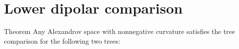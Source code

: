 \section{Lower dipolar comparison}

\begin{thm}{Theorem}
Any Alexandrov space with nonnegative curvature satisfies the tree comparison for the following two trees:

\begin{comment}
\begin{center}
\begin{tikzpicture}[scale=1,
  thick,main node/.style={circle,draw,font=\sffamily\bfseries,minimum size=3mm}]
  \node[main node] (1) at (0,0) {};
  \node[main node] (2) at (0,1){};
  \node[main node] (3) at (0,2){};
  \node[main node] (4) at (1,0) {};
  \node[main node] (5) at (1,1) {};
  

  \path[every node/.style={font=\sffamily\small}]
   (1) edge node[above]{}(2)
   (2) edge node[above]{}(3)
   (2) edge node[above]{}(5)
   (4) edge node[above]{}(5);
\end{tikzpicture}
\hskip10mm
\begin{tikzpicture}[scale=1,
  thick,main node/.style={circle,draw,font=\sffamily\bfseries,minimum size=3mm}]

  \node[main node] (1) at (0,0) {};
  \node[main node] (2) at (0,1){};
  \node[main node] (3) at (0,2){};
  \node[main node] (4) at (1,0) {};
  \node[main node] (5) at (1,1) {};
  \node[main node] (6) at (1,2) {};

  \path[every node/.style={font=\sffamily\small}]
   (1) edge node[above]{}(2)
   (2) edge node[above]{}(3)
   (2) edge node[above]{}(5)
   (4) edge node[above]{}(5)
   (5) edge node[above]{}(6);
\end{tikzpicture}
\hskip10mm
\begin{tikzpicture}[scale=1,
  thick,main node/.style={circle,draw,font=\sffamily\bfseries,minimum size=3mm}]

  \node[main node] (1) at (0,1) {};
  \node[main node] (2) at (1,0){};
  \node[main node] (3) at (1,1){};
  \node[main node] (4) at (1,2) {};
  \node[main node] (5) at (2,0) {};
  \node[main node] (6) at (2,1) {};

  \path[every node/.style={font=\sffamily\small}]
   (1) edge node[above]{}(3)
   (2) edge node[above]{}(3)
   (3) edge node[above]{}(6)
   (4) edge node[above]{}(3)
   (5) edge node[above]{}(6);
\end{tikzpicture}
\end{center}
\end{comment}

\end{thm}

